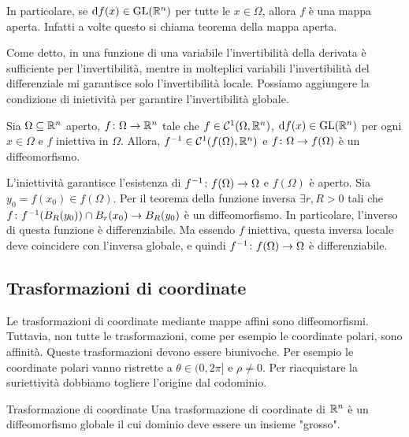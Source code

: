 \documentclass[a4paper]{article}
\begin{document}
In particolare, se \(\text{d}f(x) \in \text{GL}(\mathbb{R}^n)\)
per tutte le \(x \in \Omega\), allora \(f\) è una mappa aperta.
Infatti a volte questo si chiama teorema della mappa aperta.

Come detto, in una funzione di una variabile l'invertibilità della derivata è sufficiente
per l'invertibilità, mentre in molteplici variabili l'invertibilità del differenziale
mi garantisce solo l'invertibilità locale.
Possiamo aggiungere la condizione di inietività per garantire l'invertibilità globale.

\begin{snippetcorollary}{}
    Sia \(\Omega \subseteq \mathbb{R}^n\) aperto,
    \(f \colon \Omega \to \mathbb{R}^n\) tale che \(f \in \mathcal{C}^1(\Omega, \mathbb{R}^n)\),
    \(\text{d}f(x) \in \text{GL}(\mathbb{R}^n)\) per ogni \(x\in \Omega\)
    e \(f\) iniettiva in \(\Omega\).
    Allora, \(f^{-1} \in \mathcal{C}^1(f(\Omega), \mathbb{R}^n)\)
    e \(f \colon \Omega \to f(\Omega)\) è un diffeomorfismo.
\end{snippetcorollary}

\begin{snippetproof}{}
    L'iniettività garantisce l'esistenza di
    \(f^{-1} \colon f(\Omega) \to \Omega\) e \(f(\Omega)\) è aperto.
    Sia \(y_0 = f(x_0) \in f(\Omega)\).
    Per il teorema della funzione inversa \(\exists r, R>0\)
    tali che \(f\colon f^{-1}(B_R(y_0)) \cap B_r(x_0) \to B_R(y_0)\)
    è un diffeomorfismo.
    In particolare, l'inverso di questa funzione è differenziabile.
    Ma essendo \(f\) iniettiva, questa inversa locale deve coincidere con l'inversa globale,
    e quindi \(f^{-1} \colon f(\Omega) \to \Omega\) è differenziabile.
\end{snippetproof}

\subsection{Trasformazioni di coordinate}

\begin{radioactive}
Le trasformazioni di coordinate mediante mappe affini sono diffeomorfismi.
Tuttavia, non tutte le trasformazioni, come per esempio le coordinate polari, sono affinità.
Queste trasformazioni devono essere biunivoche.
Per esempio le coordinate polari vanno ristrette a \(\theta\in(0,2\pi]\)
e \(\rho \neq 0\). Per riacquistare la suriettività dobbiamo togliere l'origine dal codominio.

\begin{snippetdefinition}{Trasformazione di coordinate}
    Una trasformazione di coordinate di \(\mathbb{R}^n\)
    è un diffeomorfismo globale il cui dominio deve essere un insieme "grosso".
\end{snippetdefinition}
\end{radioactive}
\end{document}

